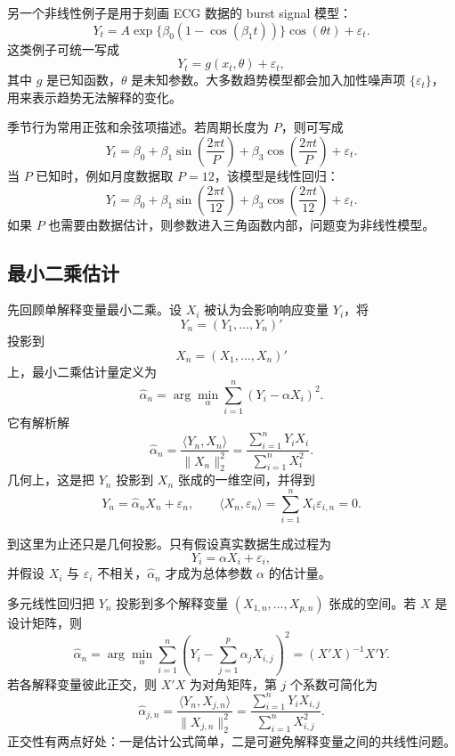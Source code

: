 \documentclass[11pt,a4paper]{ctexart}
\begin{document}
另一个非线性例子是用于刻画 ECG 数据的 burst signal 模型：
\begin{equation}
  Y_t=A\exp\{\beta_0(1-\cos(\beta_1 t))\}\cos(\theta t)+\varepsilon_t. \tag{2.4}
\end{equation}
这类例子可统一写成
\begin{equation}
  Y_t=g(x_t,\theta)+\varepsilon_t, \tag{2.5}
\end{equation}
其中 \(g\) 是已知函数，\(\theta\) 是未知参数。大多数趋势模型都会加入加性噪声项 \(\{\varepsilon_t\}\)，用来表示趋势无法解释的变化。

季节行为常用正弦和余弦项描述。若周期长度为 \(P\)，则可写成
\[
  Y_t=\beta_0+\beta_1\sin\left(\frac{2\pi t}{P}\right)
      +\beta_3\cos\left(\frac{2\pi t}{P}\right)+\varepsilon_t.
\]
当 \(P\) 已知时，例如月度数据取 \(P=12\)，该模型是线性回归：
\begin{equation}
  Y_t=\beta_0+\beta_1\sin\left(\frac{2\pi t}{12}\right)
      +\beta_3\cos\left(\frac{2\pi t}{12}\right)+\varepsilon_t. \tag{2.6}
\end{equation}
如果 \(P\) 也需要由数据估计，则参数进入三角函数内部，问题变为非线性模型。

\subsection{最小二乘估计}

先回顾单解释变量最小二乘。设 \(X_i\) 被认为会影响响应变量 \(Y_i\)，将
\[
  Y_n=(Y_1,\ldots,Y_n)'
\]
投影到
\[
  X_n=(X_1,\ldots,X_n)'
\]
上，最小二乘估计量定义为
\[
  \hat{\alpha}_n
  =\arg\min_\alpha \sum_{i=1}^n (Y_i-\alpha X_i)^2.
\]
它有解析解
\[
  \hat{\alpha}_n
  =\frac{\langle Y_n,X_n\rangle}{\|X_n\|_2^2}
  =\frac{\sum_{i=1}^n Y_iX_i}{\sum_{i=1}^n X_i^2}.
\]
几何上，这是把 \(Y_n\) 投影到 \(X_n\) 张成的一维空间，并得到
\[
  Y_n=\hat{\alpha}_n X_n+\varepsilon_n,
  \qquad
  \langle X_n,\varepsilon_n\rangle=\sum_{i=1}^n X_i\varepsilon_{i,n}=0.
\]

到这里为止还只是几何投影。只有假设真实数据生成过程为
\[
  Y_i=\alpha X_i+\varepsilon_i,
\]
并假设 \(X_i\) 与 \(\varepsilon_i\) 不相关，\(\hat{\alpha}_n\) 才成为总体参数 \(\alpha\) 的估计量。

多元线性回归把 \(Y_n\) 投影到多个解释变量 \((X_{1,n},\ldots,X_{p,n})\) 张成的空间。若 \(X\) 是设计矩阵，则
\[
  \hat{\alpha}_n
  =\arg\min_\alpha \sum_{i=1}^n
  \left(Y_i-\sum_{j=1}^p\alpha_jX_{i,j}\right)^2
  =(X'X)^{-1}X'Y.
\]
若各解释变量彼此正交，则 \(X'X\) 为对角矩阵，第 \(j\) 个系数可简化为
\[
  \hat{\alpha}_{j,n}
  =\frac{\langle Y_n,X_{j,n}\rangle}{\|X_{j,n}\|_2^2}
  =\frac{\sum_{i=1}^nY_iX_{i,j}}{\sum_{i=1}^nX_{i,j}^2}.
\]
正交性有两点好处：一是估计公式简单，二是可避免解释变量之间的共线性问题。
\end{document}
